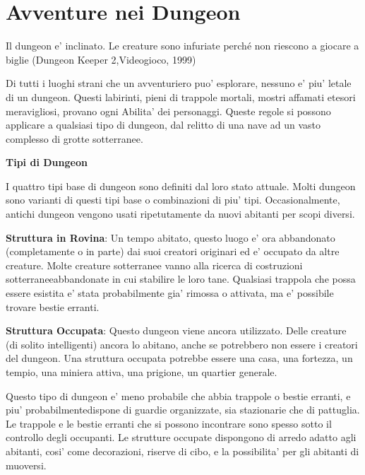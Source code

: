 \documentclass[a4paper,11pt,twoside,openany]{dndbook}
\begin{document}
\pagebreak

\section{Avventure nei Dungeon}

\label{avventure-nei-dungeon}
\begin{quotebox}
Il dungeon e' inclinato. Le creature sono infuriate perché non riescono a giocare a biglie (Dungeon Keeper 2,Videogioco, 1999)
\end{quotebox}

Di tutti i luoghi strani che un avventuriero puo' esplorare, nessuno e' piu' letale di un dungeon. Questi labirinti, pieni di trappole mortali, mostri affamati etesori meravigliosi, provano ogni Abilita' dei personaggi. Queste regole si possono applicare a qualsiasi tipo di dungeon, dal relitto di una nave ad un vasto complesso di grotte sotterranee.

\textbf{Tipi di Dungeon}

I quattro tipi base di dungeon sono definiti dal loro stato attuale. Molti dungeon sono varianti di questi tipi base o combinazioni di piu' tipi. Occasionalmente, antichi dungeon vengono usati ripetutamente da nuovi abitanti per scopi diversi.

\textbf{Struttura in Rovina}: Un tempo abitato, questo luogo e' ora abbandonato (completamente o in parte) dai suoi creatori originari ed e' occupato da altre creature. Molte creature sotterranee vanno alla ricerca di costruzioni sotterraneeabbandonate in cui stabilire le loro tane. Qualsiasi trappola che possa essere esistita e' stata probabilmente gia' rimossa o attivata, ma e' possibile trovare bestie erranti.

\textbf{Struttura Occupata}: Questo dungeon viene ancora utilizzato. Delle creature (di solito intelligenti) ancora lo abitano, anche se potrebbero non essere i creatori del dungeon. Una struttura occupata potrebbe essere una casa, una fortezza, un tempio, una miniera attiva, una prigione, un quartier generale. 

Questo tipo di dungeon e' meno probabile che abbia trappole o bestie erranti, e piu' probabilmentedispone di guardie organizzate, sia stazionarie che di pattuglia. Le trappole e le bestie erranti che si possono incontrare sono spesso sotto il controllo degli occupanti. Le strutture occupate dispongono di arredo adatto agli abitanti, cosi' come decorazioni, riserve di cibo, e la possibilita' per gli abitanti di muoversi.
\end{document}
